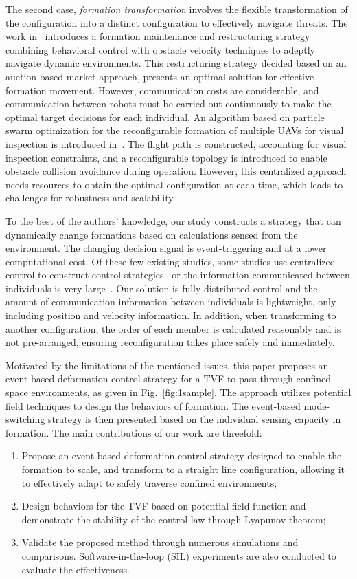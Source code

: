 The second case, \textit{formation transformation} involves the flexible transformation of the configuration into a distinct configuration to effectively navigate threats. The work in~\cite{Fu2020} introduces a formation maintenance and restructuring strategy combining behavioral control with obstacle velocity techniques to adeptly navigate dynamic environments. This restructuring strategy decided based on an auction-based market approach, presents an optimal solution for effective formation movement. However, communication costs are considerable, and communication between robots must be carried out continuously to make the optimal target decisions for each individual. An algorithm based on particle swarm optimization for the reconfigurable formation of multiple UAVs for visual inspection is introduced in~\cite{8843165}. The flight path is constructed, accounting for visual inspection constraints, and a reconfigurable topology is introduced to enable obstacle collision avoidance during operation. However, this centralized approach needs resources to obtain the optimal configuration at each time, which leads to challenges for robustness and scalability.

To the best of the authors' knowledge, our study constructs a strategy that can dynamically change formations based on calculations sensed from the environment. The changing decision signal is event-triggering and at a lower computational cost. Of these few existing studies, some studies use centralized control to construct control strategies~\cite{Gmez2013,Roy2018,AlonsoMora2017,8843165} or the information communicated between individuals is very large~\cite{Saska2020,Fu2020}. Our solution is fully distributed control and the amount of communication information between individuals is lightweight, only including position and velocity information. In addition, when transforming to another configuration, the order of each member is calculated reasonably and is not pre-arranged, ensuring reconfiguration takes place safely and immediately.

Motivated by the limitations of the mentioned issues, this paper proposes an event-based deformation control strategy for a TVF to pass through confined space environments, as given in Fig.~\ref{fig:1sample}. The approach utilizes potential field techniques to design the behaviors of formation. The event-based mode-switching strategy is then presented based on the individual sensing capacity in formation. The main contributions of our work are threefold:
\begin{enumerate}
    \item Propose an event-based deformation control strategy designed to enable the formation to scale, and transform to a straight line configuration, allowing it to effectively adapt to safely traverse confined environments;
        \item Design behaviors for the TVF based on potential field function and demonstrate the stability of the control law through Lyapunov theorem;
    \item Validate the proposed method through numerous simulations and comparisons. Software-in-the-loop (SIL) experiments are also conducted to evaluate the effectiveness.
\end{enumerate}

